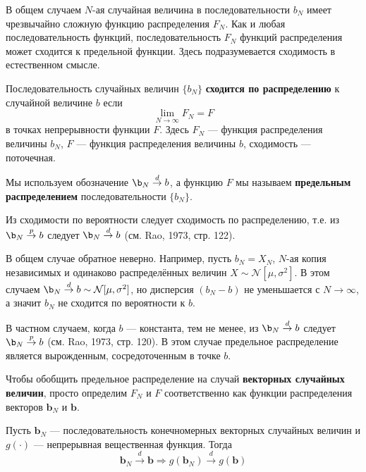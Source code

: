 В общем случаем $N$-ая случайная величина в последовательности $b_N$ имеет чрезвычайно сложную функцию распределения $F_N$. Как и любая последовательность функций, последовательность $F_N$ функций распределения может сходится к предельной функции. Здесь подразумевается сходимость в естественном смысле.

\begin{definition} 
\label{def:A10}
Последовательность случайных величин $\{b_N\}$ \textbf{сходится по распределению} к случайной величине $b$ если
\begin{equation}
\label{eq:A9}
\lim_{N\to\infty} F_N = F
\end{equation}
в точках непрерывности функции $F$. Здесь $F_N$ --- функция распределения величины $b_N$, $F$ --- функция распределения величины $b$, сходимость --- поточечная.
\end{definition}

Мы используем обозначение $\b_N \overset{d}{\to}b$, а функцию $F$ мы называем \textbf{предельным распределением} последовательности $\{b_N\}$.

Из сходимости по вероятности следует сходимость по распределению, т.е. из $\b_N \overset{p}{\to}b$ следует $\b_N \overset{d}{\to}b$ (см. Rao, 1973, стр. 122).

В общем случае обратное неверно. Например, пусть $b_N=X_N$, $N$-ая копия независимых и одинаково распределённых величин $X \sim \mathcal{N}[\mu,\sigma^2]$. В этом случаем $\b_N \overset{d}{\to}b\sim \mathcal{N}[\mu,\sigma^2]$, но дисперсия $(b_N-b)$ не уменьшается с $N\to \infty$, а значит $b_N$ не сходится по вероятности к $b$.

В частном случаем, когда $b$ --- константа, тем не менее, из $\b_N \overset{d}{\to}b$ следует $\b_N \overset{p}{\to}b$ (см. Rao, 1973, стр. 120). В этом случае предельное распределение является вырожденным, сосредоточенным в точке $b$.

Чтобы обобщить предельное распределение на случай \textbf{векторных случайных величин}, просто определим $F_N$ и $F$ соответственно как функции распределения векторов $\mathbf{b}_N$ и $\mathbf{b}$.

\begin{theorem}
\label{th:A11}
Пусть $\mathbf{b}_N$ --- последовательность конечномерных векторных случайных величин и $g(\cdot)$ --- непрерывная вещественная функция. Тогда
\begin{equation}
\mathbf{b}_N \overset{d}{\to} \mathbf{b} \Rightarrow g(\mathbf{b}_N) \overset{d}{\to} g(\mathbf{b})
\end{equation}
\end{theorem}

